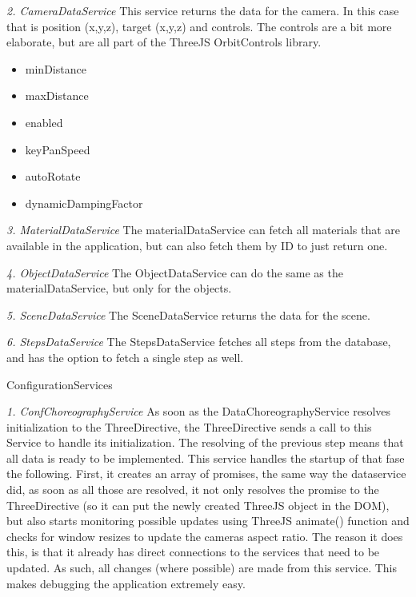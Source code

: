 \textit{2. CameraDataService} \newline
This service returns the data for the camera. In this case that is position (x,y,z), target (x,y,z) and controls. The controls are a bit more elaborate, but are all part of the ThreeJS OrbitControls library.
\begin{itemize}
	\item minDistance
	\item maxDistance
	\item enabled
	\item keyPanSpeed
	\item autoRotate
	\item dynamicDampingFactor
\end{itemize}

\textit{3. MaterialDataService} \newline
The materialDataService can fetch all materials that are available in the application, but can also fetch them by ID to just return one.

\textit{4. ObjectDataService} \newline
The ObjectDataService can do the same as the materialDataService, but only for the objects.

\textit{5. SceneDataService} \newline
The SceneDataService returns the data for the scene.

\textit{6. StepsDataService} \newline
The StepsDataService fetches all steps from the database, and has the option to fetch a single step as well.

ConfigurationServices \newline

\textit{1. ConfChoreographyService} \newline
As soon as the DataChoreographyService resolves initialization to the ThreeDirective, the ThreeDirective sends a call to this Service to handle its initialization. The resolving of the previous step means that all data is ready to be implemented. This service handles the startup of that fase the following. First, it creates an array of promises, the same way the dataservice did, as soon as all those are resolved, it not only resolves the promise to the ThreeDirective (so it can put the newly created ThreeJS object in the DOM), but also starts monitoring possible updates using ThreeJS animate() function and checks for window resizes to update the cameras aspect ratio. The reason it does this, is that it already has direct connections to the services that need to be updated. As such, all changes (where possible) are made from this service. This makes debugging the application extremely easy.

